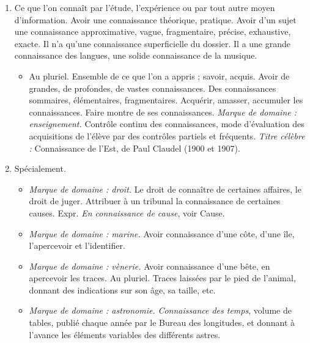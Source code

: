 \begin{graybox}
\begin{enumerate}
        \item Ce que l'on connaît par l'étude, l'expérience ou par tout autre
        moyen d'information. Avoir une connaissance théorique, pratique. Avoir
        d'un sujet une connaissance approximative, vague, fragmentaire,
        précise, exhaustive, exacte. Il n'a qu'une connaissance superficielle
        du dossier. Il a une grande connaissance des langues, une solide
        connaissance de la musique.
        \begin{itemize}
            \item Au pluriel. Ensemble de ce que l'on a appris ; savoir,
            acquis. Avoir de grandes, de profondes, de vastes connaissances.
            Des connaissances sommaires, élémentaires, fragmentaires. Acquérir,
            amasser, accumuler les connaissances. Faire montre de ses
            connaissances. \textit{Marque de domaine : enseignement.} Contrôle
            continu des connaissances, mode d'évaluation des acquisitions de
            l'élève par des contrôles partiels et fréquents. \textit{Titre
            célèbre :} Connaissance de l'Est, de Paul Claudel (1900 et 1907).
        \end{itemize}

        \item Spécialement.
        \begin{itemize}
            \item \textit{Marque de domaine : droit.} Le droit de connaître
            de certaines affaires, le droit de juger. Attribuer à un tribunal
            la connaissance de certaines causes. Expr. \textit{En connaissance
            de cause}, voir Cause.

            \item \textit{Marque de domaine : marine.} Avoir connaissance d'une
            côte, d'une île, l'apercevoir et l'identifier.

            \item \textit{Marque de domaine : vènerie.} Avoir connaissance
            d'une bête, en apercevoir les traces. Au pluriel. Traces laissées
            par le pied de l'animal, donnant des indications sur son âge, sa
            taille, etc.

            \item \textit{Marque de domaine : astronomie.} \textit{Connaissance
            des temps}, volume de tables, publié chaque année par le Bureau des
            longitudes, et donnant à l'avance les éléments variables des
            différents astres.
        \end{itemize}
    \end{enumerate}


\end{graybox}
